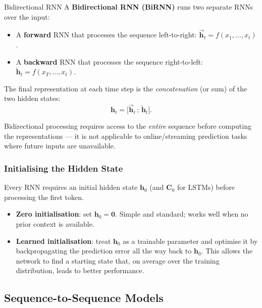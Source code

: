 \documentclass[11pt,a4paper]{article}
\newcommand{\term}[1]{\textcolor{DefGreen}{\textbf{#1}}\index{#1}}
\begin{document}
\begin{defbox}{Bidirectional RNN}
A \term{Bidirectional RNN (BiRNN)} runs two separate RNNs over the input:
\begin{itemize}
  \item A \textbf{forward} RNN that processes the sequence left-to-right: $\overrightarrow{\mathbf{h}}_t = f(x_1,\ldots,x_t)$.
  \item A \textbf{backward} RNN that processes the sequence right-to-left: $\overleftarrow{\mathbf{h}}_t = f(x_T,\ldots,x_t)$.
\end{itemize}
The final representation at each time step is the \emph{concatenation} (or sum) of the two hidden states:
\[
  \mathbf{h}_t = \bigl[\overrightarrow{\mathbf{h}}_t\,;\,\overleftarrow{\mathbf{h}}_t\bigr].
\]
\end{defbox}

\begin{notebox}
Bidirectional processing requires access to the \emph{entire} sequence before computing the representations — it is not applicable to online/streaming prediction tasks where future inputs are unavailable.
\end{notebox}

\subsubsection{Initialising the Hidden State}

Every RNN requires an initial hidden state $\mathbf{h}_0$ (and $\mathbf{C}_0$ for LSTMs) before processing the first token.

\begin{itemize}
  \item \textbf{Zero initialisation}: set $\mathbf{h}_0 = \mathbf{0}$. Simple and standard; works well when no prior context is available.
  \item \textbf{Learned initialisation}: treat $\mathbf{h}_0$ as a trainable parameter and optimise it by backpropagating the prediction error all the way back to $\mathbf{h}_0$. This allows the network to find a starting state that, on average over the training distribution, leads to better performance.
\end{itemize}

\subsection{Sequence-to-Sequence Models}
\label{sec:seq2seq}
\end{document}
